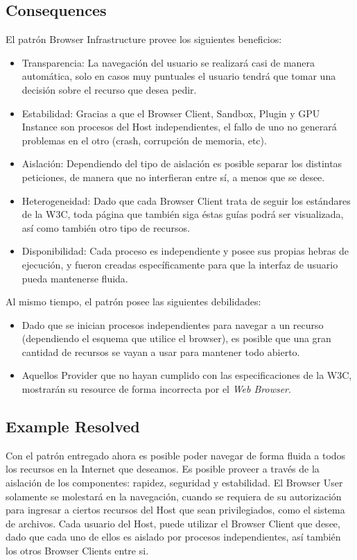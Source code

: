 \documentclass{sig-alternate-05-2015}
\begin{document}
  \subsection*{Consequences}
  El patrón Browser Infrastructure provee los siguientes beneficios:
  \begin{itemize}
    \item Transparencia: La navegación del usuario se realizará casi de manera automática, solo en casos muy puntuales el usuario tendrá que tomar una decisión sobre el recurso que desea pedir.
    \item Estabilidad: Gracias a que el Browser Client, Sandbox, Plugin y GPU Instance son procesos del Host independientes, el fallo de uno no generará problemas en el otro (crash, corrupción de memoria, etc).
    \item Aislación: Dependiendo del tipo de aislación es posible separar los distintas peticiones, de manera que no interfieran entre sí, a menos que se desee.
    \item Heterogeneidad: Dado que cada Browser Client trata de seguir los estándares de la W3C, toda página que también siga éstas guías podrá ser visualizada, así como también otro tipo de recursos.
    \item Disponibilidad: Cada proceso es independiente y posee sus propias hebras de ejecución, y fueron creadas específicamente para que la interfaz de usuario pueda mantenerse fluida.
  \end{itemize}
  Al mismo tiempo, el patrón posee las siguientes debilidades:
  \begin{itemize}
    \item Dado que se inician procesos independientes para navegar a un recurso (dependiendo el esquema que utilice el browser), es posible que una gran cantidad de recursos se vayan a usar para mantener todo abierto.
    \item Aquellos Provider que no hayan cumplido con las especificaciones de la W3C, mostrarán su resource de forma incorrecta por el \textit{Web Browser}.
  \end{itemize}

  \subsection*{Example Resolved}
  Con el patrón entregado ahora es posible poder navegar de forma fluida a todos los recursos en la Internet que deseamos. Es posible proveer a través de la aislación de los componentes: rapidez, seguridad y estabilidad. El Browser User solamente se molestará en la navegación, cuando se requiera de su autorización para ingresar a ciertos recursos del Host que sean privilegiados, como el sistema de archivos. Cada usuario del Host, puede utilizar el Browser Client que desee, dado que cada uno de ellos es aislado por procesos independientes, así también los otros Browser Clients entre si.
\end{document}
